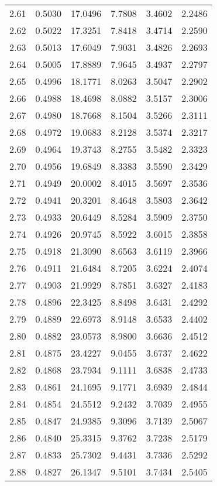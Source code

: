 \documentclass{article}
\begin{document}
\begin{longtable}{cccccc}
2.61 & 0.5030 & 17.0496 & 7.7808 & 3.4602 & 2.2486 \\
2.62 & 0.5022 & 17.3251 & 7.8418 & 3.4714 & 2.2590 \\
2.63 & 0.5013 & 17.6049 & 7.9031 & 3.4826 & 2.2693 \\
2.64 & 0.5005 & 17.8889 & 7.9645 & 3.4937 & 2.2797 \\
2.65 & 0.4996 & 18.1771 & 8.0263 & 3.5047 & 2.2902 \\
2.66 & 0.4988 & 18.4698 & 8.0882 & 3.5157 & 2.3006 \\
2.67 & 0.4980 & 18.7668 & 8.1504 & 3.5266 & 2.3111 \\
2.68 & 0.4972 & 19.0683 & 8.2128 & 3.5374 & 2.3217 \\
2.69 & 0.4964 & 19.3743 & 8.2755 & 3.5482 & 2.3323 \\
2.70 & 0.4956 & 19.6849 & 8.3383 & 3.5590 & 2.3429 \\
2.71 & 0.4949 & 20.0002 & 8.4015 & 3.5697 & 2.3536 \\
2.72 & 0.4941 & 20.3201 & 8.4648 & 3.5803 & 2.3642 \\
2.73 & 0.4933 & 20.6449 & 8.5284 & 3.5909 & 2.3750 \\
2.74 & 0.4926 & 20.9745 & 8.5922 & 3.6015 & 2.3858 \\
2.75 & 0.4918 & 21.3090 & 8.6563 & 3.6119 & 2.3966 \\
2.76 & 0.4911 & 21.6484 & 8.7205 & 3.6224 & 2.4074 \\
2.77 & 0.4903 & 21.9929 & 8.7851 & 3.6327 & 2.4183 \\
2.78 & 0.4896 & 22.3425 & 8.8498 & 3.6431 & 2.4292 \\
2.79 & 0.4889 & 22.6973 & 8.9148 & 3.6533 & 2.4402 \\
2.80 & 0.4882 & 23.0573 & 8.9800 & 3.6636 & 2.4512 \\
2.81 & 0.4875 & 23.4227 & 9.0455 & 3.6737 & 2.4622 \\
2.82 & 0.4868 & 23.7934 & 9.1111 & 3.6838 & 2.4733 \\
2.83 & 0.4861 & 24.1695 & 9.1771 & 3.6939 & 2.4844 \\
2.84 & 0.4854 & 24.5512 & 9.2432 & 3.7039 & 2.4955 \\
2.85 & 0.4847 & 24.9385 & 9.3096 & 3.7139 & 2.5067 \\
2.86 & 0.4840 & 25.3315 & 9.3762 & 3.7238 & 2.5179 \\
2.87 & 0.4833 & 25.7302 & 9.4431 & 3.7336 & 2.5292 \\
2.88 & 0.4827 & 26.1347 & 9.5101 & 3.7434 & 2.5405 \\

\end{longtable}
\end{document}
